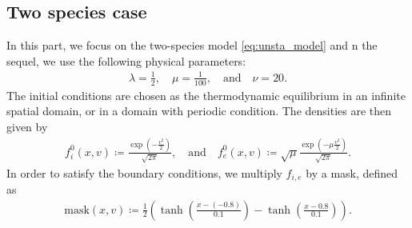 \documentclass{article}
\numberwithin{equation}{section}
\begin{document}
\subsection{Two species case} %
In this part, we focus on the two-species model \eqref{eq:unsta_model} 
and n the sequel, we use the following physical parameters:
\begin{align}\label{eq:param_simu}
	\lambda = \frac{1}{2}, \quad \mu = \frac{1}{100}, \quad\text{and}\quad \nu = 20.
\end{align}
The initial conditions are chosen as the thermodynamic equilibrium in an infinite spatial domain, or in a domain with periodic condition. The densities are then given by
\begin{align*}
	f_{i}^0 (x,v) \coloneqq \frac{\exp\left(- \frac{v^2}{2}\right)}{\sqrt{2\pi}}, \quad \text{and} \quad f_{e}^0 (x,v) \coloneqq \sqrt{\mu}\frac{\exp\left(- \mu \frac{v^2}{2}\right)}{\sqrt{2\pi}}.
\end{align*}
In order to satisfy the boundary conditions, we multiply $f_{i,e}$ by a mask, defined as
\begin{align*}
	\text{mask}(x,v) \coloneqq \frac{1}{2} \left(\tanh\left(\frac{x - (-0.8)}{0.1}\right) - \tanh\left(\frac{x - 0.8}{0.1}\right)\right).
\end{align*}
\end{document}
